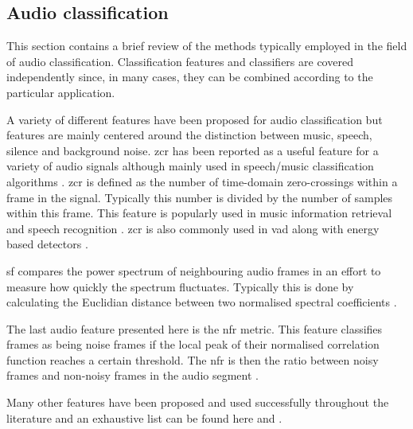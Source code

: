 %

\subsection{Audio classification}
This section contains a brief review of the methods typically employed in the field of audio classification. Classification features and classifiers are covered independently since, in many cases, they can be combined according to the particular application.

A variety of different features have been proposed for audio classification but features are mainly centered around the distinction between music, speech, silence and background noise. \gls{zcr} has been reported as a useful feature for a variety of audio signals although mainly used in speech/music classification algorithms \cite{Lu2002}. \gls{zcr} is defined as the number of time-domain zero-crossings within a frame in the signal. Typically this number is divided by the number of samples within this frame. This feature is popularly used in music information retrieval and speech recognition \cite{Saraceno1997}\cite{Scheirer1997}\cite{Gouyon2000}. \gls{zcr} is also commonly used in \gls{vad} along with energy based detectors \cite{Sangwan2002}.

\gls{sf} compares the power spectrum of neighbouring audio frames in an effort to measure how quickly the spectrum fluctuates. Typically this is done by calculating the Euclidian distance between two normalised spectral coefficients \cite{Wang2012}.

The last audio feature presented here is the \gls{nfr} metric. This feature classifies frames as being noise frames if the local peak of their normalised correlation function reaches a certain threshold. The \gls{nfr} is then the ratio between noisy frames and non-noisy frames in the audio segment \cite{Lu2002}\cite{Jiang2000}.

Many other features have been proposed and used successfully throughout the literature and an exhaustive list can be found here \cite{Scheirer1997} and \cite{Gouyon2000}.

